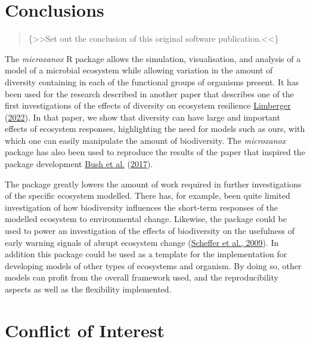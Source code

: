 \documentclass[]{elsarticle} %
\begin{document}
\hypertarget{conclusions}{%
\section{Conclusions}\label{conclusions}}

\begin{quote}
\{\textgreater\textgreater Set out the conclusion of this original
software publication.\textless\textless\}
\end{quote}

The \emph{microxanox} R package allows the simulation, visualisation,
and analysis of a model of a microbial ecosystem while allowing
variation in the amount of diversity containing in each of the
functional groups of organisms present. It has been used for the
research described in another paper that describes one of the first
investigations of the effects of diversity on ecosystem resilience
\protect\hyperlink{ref-Limberger2022}{Limberger}
(\protect\hyperlink{ref-Limberger2022}{2022}). In that paper, we show
that diversity can have large and important effects of ecosystem
responses, highlighting the need for models such as ours, with which one
can easily manipulate the amount of biodiversity. The \emph{microxanox}
package has also been used to reproduce the results of the paper that
inspired the package development \protect\hyperlink{ref-Bush2017}{Bush
et al.} (\protect\hyperlink{ref-Bush2017}{2017}).

The package greatly lowers the amount of work required in further
investigations of the specific ecosystem modelled. There has, for
example, been quite limited investigation of how biodiversity influences
the short-term responses of the modelled ecosystem to environmental
change. Likewise, the package could be used to power an investigation of
the effects of biodiversity on the usefulness of early warning signals
of abrupt ecosystem change
(\protect\hyperlink{ref-Scheffer2009}{Scheffer et al., 2009}). In
addition this package could be used as a template for the implementation
for developing models of other types of ecosystems and organism. By
doing so, other models can profit from the overall framework used, and
the reproducibility aspects as well as the flexibility implemented.

\hypertarget{conflict-of-interest}{%
\section{Conflict of Interest}\label{conflict-of-interest}}
\end{document}
